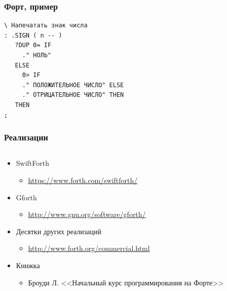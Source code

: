 \documentclass[xetex,mathserif,serif]{beamer}
\begin{document}
\begin{frame}
\begin{columns}
\begin{column}{0.18\textwidth}
\begin{center}
                \end{center}
            \end{column}
        \end{columns}
    \end{frame}

    \begin{frame}[fragile]
        \frametitle{Форт, пример}
        \begin{verbatim}
\ Напечатать знак числа
: .SIGN ( n -- )
   ?DUP 0= IF
     ." НОЛЬ"
   ELSE
     0> IF
     ." ПОЛОЖИТЕЛЬНОЕ ЧИСЛО" ELSE
     ." ОТРИЦАТЕЛЬНОЕ ЧИСЛО" THEN
   THEN
;
        \end{verbatim}
    \end{frame}

    \begin{frame}
        \frametitle{Реализации}
        \begin{columns}
            \begin{column}{0.8\textwidth}
                \begin{itemize}
                    \item SwiftForth
                    \begin{itemize}
                        \item \url{https://www.forth.com/swiftforth/}
                    \end{itemize}
                    \item Gforth
                    \begin{itemize}
                        \item \url{http://www.gnu.org/software/gforth/}
                    \end{itemize}
                    \item Десятки других реализаций
                    \begin{itemize}
                        \item \url{http://www.forth.org/commercial.html}
                    \end{itemize}
                    \item Книжка
                    \begin{itemize}
                        \item Броуди Л. <<Начальный курс программирования на Форте>>
                    \end{itemize}
                \end{itemize}
            \end{column}

\end{columns}
\end{frame}
\end{document}
